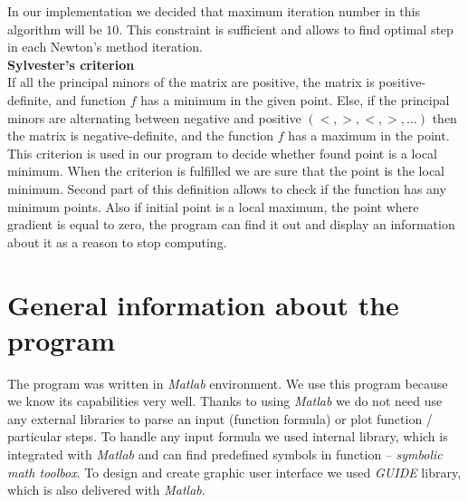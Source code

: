 \documentclass[12pt]{article}
\begin{document}
In our implementation we decided that maximum iteration number in this algorithm will be $10$. This constraint is sufficient and allows to find optimal step in each Newton's method iteration.\\

\textbf{Sylvester's criterion}\\
If all the principal minors of the matrix are positive, the matrix is positive-definite, and function $f$ has a minimum in the given point. Else, if the principal minors are alternating between negative and positive $(<, >, <, >, \dots)$ then the matrix is negative-definite, and the function $f$ has a maximum in the point. \cite{sylwek} \\
This criterion is used in our program to decide whether found point is a local minimum. When the criterion is fulfilled we are sure that the point is the local minimum. Second part of this definition allows to check if the function has any minimum points. Also if initial point is a local maximum, the point where gradient is equal to zero, the program can find it out and display an information about it as a reason to stop computing. 

\section{General information about the program}
The program was written in \textit{Matlab} environment. We use this program because we know its capabilities very well. Thanks to using \textit{Matlab} we do not need use any external libraries to parse an input (function formula) or plot function / particular steps. To handle any input formula we used internal library, which is integrated with \textit{Matlab} and can find predefined symbols in function -- \textit{symbolic math toolbox}. To design and create graphic user interface we used \textit{GUIDE} library, which is also delivered with \textit{Matlab}.
\end{document}
